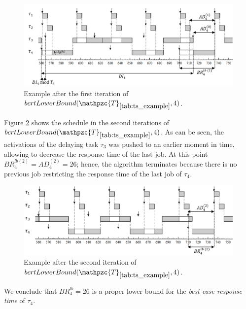 \documentclass[fleqn]{article}
\begin{document}
\begin{figure}[H]
	\centering
	\includegraphics[width=1\linewidth]{figures/bcrt_lb_ex1.PNG}
	\caption{Example after the first iteration of $bcrtLowerBound(\mathpzc{T}_{\ref{tab:ts_example}},4)$. }
	\label{fig:bcrt_lb_ex1}
\end{figure}

Figure \ref{fig:bcrt_lb_ex2} shows the schedule in the second iterations of $bcrtLowerBound(\mathpzc{T}_{\ref{tab:ts_example}},4)$. As can be seen, the activations of the delaying task $\tau_3$ was pushed to an earlier moment in time, allowing to decrease the response time of the last job. At this point $BR^{lb(2)}_4 = AD^{(2)}_4 = 26$; hence, the algorithm terminates because there is no previous job restricting the response time of the last job of $\tau_4$.

\begin{figure}[H]
	\centering
	\includegraphics[width=1\linewidth]{figures/bcrt_lb_ex2.PNG}
	\caption{Example after the second iteration of $bcrtLowerBound(\mathpzc{T}_{\ref{tab:ts_example}},4)$. }
	\label{fig:bcrt_lb_ex2}
\end{figure}

We conclude that  $BR^{lb}_4 = 26$ is a proper lower bound for the \textit{best-case response time} of $\tau_4$.
\end{document}
